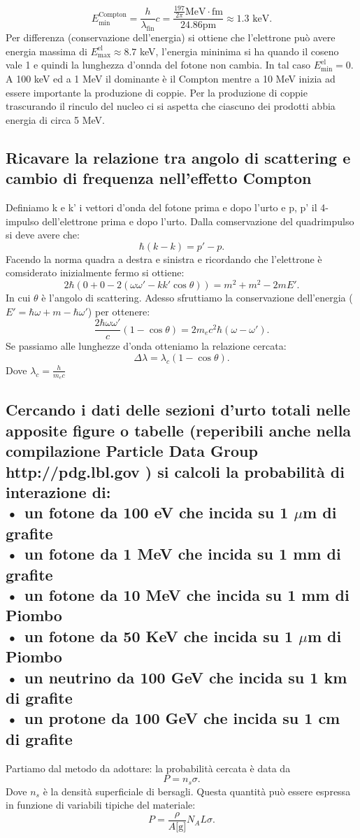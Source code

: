 \[
E^{\text{Compton}}_{\text{min}}= \frac{h}{\lambda_{\text{fin}}}c = \frac{\frac{197}{2\pi}\text{MeV}\cdot\text{fm}}{24.86 \text{pm}} \approx 1.3 \text{ keV}
.\] 
Per differenza (conservazione dell'energia) si ottiene che l'elettrone può avere energia massima di $E^{\text{el}}_{\text{max}} \approx 8.7$ keV, l'energia mininima si ha quando il coseno vale 1 e quindi la lunghezza d'onnda del fotone non cambia. In tal caso $E^{\text{el}}_{\text{min}}=0$.\\
A 100 keV ed a 1 MeV il dominante è il Compton mentre a 10 MeV inizia ad essere importante la produzione di coppie.
Per la produzione di coppie trascurando il rinculo del nucleo ci si aspetta che ciascuno dei prodotti abbia energia di circa 5 MeV.

\subsection[]{Ricavare la relazione tra angolo di scattering e cambio di frequenza nell'effetto Compton
}
\label{sec:4.b.22}
Definiamo k e k' i vettori d'onda del fotone prima e dopo l'urto e p, p' il 4-impulso dell'elettrone prima e dopo l'urto. Dalla comservazione del quadrimpulso si deve avere che:
\[
	\hbar\left( k- k \right)= p'-p	
.\] 
Facendo la norma quadra a destra e sinistra e ricordando che l'elettrone è comsiderato inizialmente fermo si ottiene:
\[
	2\hbar\left( 0 + 0 - 2\left( \omega\omega'- kk'\cos\theta\right) \right) = m^2+m^2- 2mE'
.\] 
In cui $\theta$ è l'angolo di scattering. Adesso sfruttiamo la conservazione dell'energia ($E' = \hbar\omega + m - \hbar\omega'$) per ottenere:
\[
	\frac{2\hbar\omega\omega'}{c}\left( 1-\cos\theta \right) = 2m_{e}c^2\hbar\left( \omega-\omega' \right) 
.\] 
Se passiamo alle lunghezze d'onda otteniamo la relazione cercata:
\[
	\Delta \lambda = \lambda_{c}\left( 1-\cos\theta \right) 
.\] 
Dove $\lambda_{c}= \frac{h}{m_{e}c}$ 



\subsection[]{Cercando i dati delle sezioni d’urto totali nelle apposite figure o tabelle (reperibili anche nella compilazione Particle Data Group http://pdg.lbl.gov ) si calcoli la probabilità di interazione di:\\
• un fotone da 100 eV che incida su 1 $\mu$m di grafite\\
• un fotone da 1 MeV che incida su 1 mm di grafite\\
• un fotone da 10 MeV che incida su 1 mm di Piombo\\
• un fotone da 50 KeV che incida su 1 $\mu$m di Piombo\\
• un neutrino da 100 GeV che incida su 1 km di grafite\\
• un protone da 100 GeV che incida su 1 cm di grafite\\
}
\label{sec:4.b.23}
Partiamo dal metodo da adottare: la probabilità cercata è data da
\[
	P = n_{s}\sigma
.\] Dove $n_{s}$ è la densità superficiale di bersagli. Questa quantità può essere espressa in funzione di variabili tipiche del materiale:
\[
	P = \frac{\rho}{A \text{[g]}}N_{A}L\sigma
.\] 
